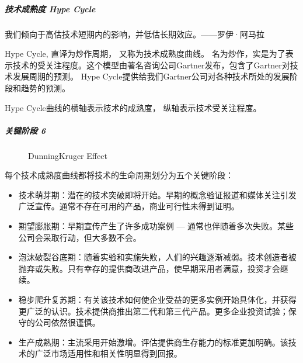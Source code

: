 \documentclass[letterpaper,10pt,english]{sphinxmanual}
\begin{document}
\subparagraph{技术成熟度 Hype Cycle}
\label{\detokenize{chapter_knowledge/industry_analysis:hype-cycle}}
我们倾向于高估技术短期内的影响，并低估长期效应。——罗伊·阿马拉

Hype Cycle, 直译为炒作周期， 又称为技术成熟度曲线。
名为炒作，实是为了表示技术的受关注程度。这个模型由著名咨询公司Gartner发布，包含了Gartner对技术发展周期的预测。
Hype Cycle提供给我们Gartner公司对各种技术所处的发展阶段和趋势的预测。

Hype Cycle曲线的横轴表示技术的成熟度， 纵轴表示技术受关注程度。


\subparagraph{关键阶段 6\sphinxfootnotemark[504]}
\label{\detokenize{chapter_knowledge/industry_analysis:id11}}%
\begin{footnotetext}[504]\sphinxAtStartFootnote
{}
%
\end{footnotetext}\ignorespaces 
\begin{figure}[H]
\centering
\capstart

\noindent{}
\caption{Dunning\sphinxhyphen{}Kruger Effect}\label{\detokenize{chapter_knowledge/industry_analysis:id28}}\end{figure}

\begin{center}\end{center} 

每个技术成熟度曲线都将技术的生命周期划分为五个关键阶段：
\begin{itemize}
\item {} 
技术萌芽期：潜在的技术突破即将开始。早期的概念验证报道和媒体关注引发广泛宣传。通常不存在可用的产品，商业可行性未得到证明。

\item {} 
期望膨胀期：早期宣传产生了许多成功案例 —
通常也伴随着多次失败。某些公司会采取行动，但大多数不会。

\item {} 
泡沫破裂谷底期：随着实验和实施失败，人们的兴趣逐渐减弱。技术创造者被抛弃或失败。只有幸存的提供商改进产品，使早期采用者满意，投资才会继续。

\item {} 
稳步爬升复苏期：有关该技术如何使企业受益的更多实例开始具体化，并获得更广泛的认识。技术提供商推出第二代和第三代产品。更多企业投资试验；保守的公司依然很谨慎。

\item {} 
生产成熟期：主流采用开始激增。评估提供商生存能力的标准更加明确。该技术的广泛市场适用性和相关性明显得到回报。

\end{itemize}
\end{document}
